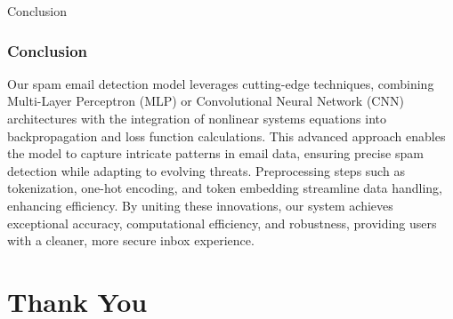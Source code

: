 \documentclass[aspectratio=1610]{beamer}
\begin{document}
\begin{frame}{Conclusion}
    \frametitle{Conclusion}
    Our spam email detection model leverages cutting-edge techniques, 
    combining Multi-Layer Perceptron (MLP) or 
    Convolutional Neural Network (CNN) 
    architectures with the integration of nonlinear systems equations into backpropagation 
    and loss function calculations. This advanced approach enables the model to capture intricate patterns in email data, ensuring precise spam detection while adapting to evolving threats. Preprocessing steps such as tokenization, one-hot encoding, and token embedding streamline data handling, enhancing efficiency. By uniting these innovations, our system achieves exceptional accuracy, computational efficiency, and robustness, providing users with a cleaner, more secure inbox experience.
    
\end{frame}

\section{Thank You}
\end{document}
